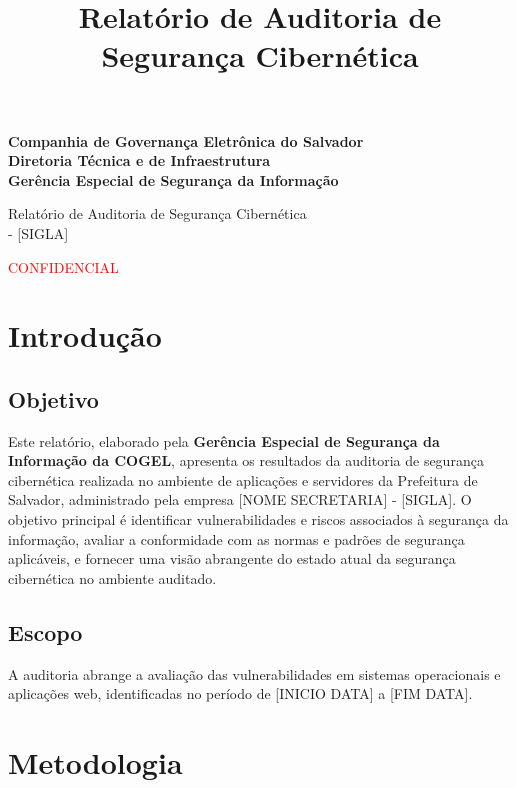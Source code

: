 \documentclass[a4paper,12pt]{article}
\title{Relatório de Auditoria de Segurança Cibernética}
\author{}
\date{}
\begin{document}
\begin{center}
    \large{\textbf{Companhia de Governança Eletrônica do Salvador\\
Diretoria Técnica e de Infraestrutura\\
Gerência Especial de Segurança da Informação\\
}}

\vspace{7cm}

\Large Relatório de Auditoria de Segurança Cibernética\\
[NOME SECRETARIA] - [SIGLA]

\vspace{4cm}
\textcolor{red}{CONFIDENCIAL}
\end{center}
\newpage

\tableofcontents  %


\newpage

\section{Introdução}
\subsection{Objetivo}
Este relatório, elaborado pela \textbf{Gerência Especial de Segurança da Informação da COGEL}, apresenta os resultados da auditoria de segurança cibernética realizada no ambiente de aplicações e servidores da Prefeitura de Salvador, administrado pela empresa [NOME SECRETARIA] - [SIGLA].
O objetivo principal é identificar vulnerabilidades e riscos associados à segurança da informação, avaliar a conformidade com as normas e padrões de segurança aplicáveis, e fornecer uma visão abrangente do estado atual da segurança cibernética no ambiente auditado.
\subsection{Escopo}
A auditoria abrange a avaliação das vulnerabilidades em sistemas operacionais e aplicações web, identificadas no período de [INICIO DATA] a [FIM DATA].
\section{Metodologia}
\end{document}
